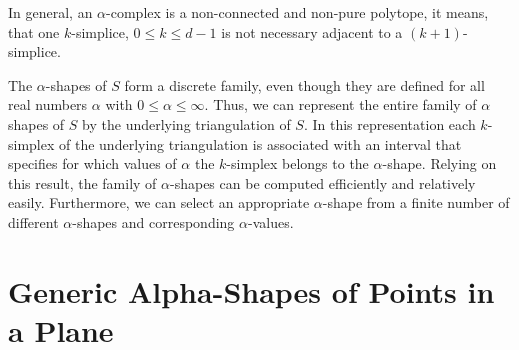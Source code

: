 In general, an $\alpha$-complex is a non-connected and non-pure polytope, it
means, that one $k$-simplice, $0 \leq k \leq d-1$ is not necessary adjacent to
a $(k+1)$-simplice.

The $\alpha$-shapes of $S$ form a discrete family, even though they
are defined for all real numbers $\alpha$ with $0 \leq \alpha
\leq \infty$. Thus, we can represent the entire family of $\alpha$ shapes
of $S$ by the underlying triangulation of $S$. In this representation
each $k$-simplex of the underlying triangulation is associated with an
interval that specifies for which values of $\alpha$ the $k$-simplex
belongs to the $\alpha$-shape. Relying on this result, the family of
$\alpha$-shapes can be computed efficiently and relatively
easily. Furthermore, we can select an appropriate $\alpha$-shape from a
finite number of different $\alpha$-shapes and corresponding
$\alpha$-values.


\section{Generic Alpha-Shapes of Points in a Plane \label{I1_SectAlpha_Shape_2}}


